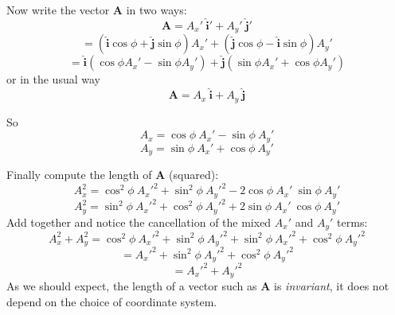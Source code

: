 \documentclass[11pt, oneside]{article}
\begin{document}
Now write the vector $\mathbf{A}$ in two ways:
\[ \mathbf{A} = A_x' \ \mathbf{\hat{i}}' + A_y' \ \mathbf{\hat{j}}'  \]
\[ = (\mathbf{\hat{i}} \cos \phi + \mathbf{\hat{j}} \sin \phi) A_x' + (\mathbf{\hat{j}} \cos \phi - \mathbf{\hat{i}} \sin \phi) A_y' \]
\[ = \mathbf{\hat{i}}(\cos \phi A_x' - \sin \phi A_y') + \mathbf{\hat{j}}(\sin \phi A_x' + \cos \phi A_y') \]
or in the usual way
\[ \mathbf{A} = A_x \ \mathbf{\hat{i}} + A_y \ \mathbf{\hat{j}}  \]

So
\[ A_x = \cos \phi \ A_x' - \sin \phi \ A_y' \]
\[ A_y = \sin \phi \ A_x' + \cos \phi \ A_y' \]

Finally compute the length of $\mathbf{A}$ (squared):
\[ A_x^2 =   \cos^2 \phi \ {A_x'}^2 + \sin^2 \phi \ {A_y'}^2 - 2 \cos \phi \ {A_x'}\ \sin \phi \ A_y' \]
\[ A_y^2 = \sin^2 \phi \ {A_x'}^2 + \cos^2 \phi \ {A_y'}^2 + 2 \sin \phi \ {A_x'} \  \cos \phi \ {A_y'} \]
Add together and notice the cancellation of the mixed $A_x'$ and $A_y'$ terms:
\[ A_x^2 + A_y^2 = \cos^2 \phi \ {A_x'}^2 + \sin^2 \phi \ {A_y'}^2 + \sin^2 \phi \ {A_x'}^2 + \cos^2 \phi \ {A_y'}^2 \]
\[ = {A_x'}^2 + \sin^2 \phi \ {A_y'}^2 + \cos^2 \phi \ {A_y'}^2 \]
\[ = {A_x'}^2 + {A_y'}^2 \]
As we should expect, the length of a vector such as $\mathbf{A}$ is \emph{invariant}, it does not depend on the choice of coordinate system.
\end{document}
